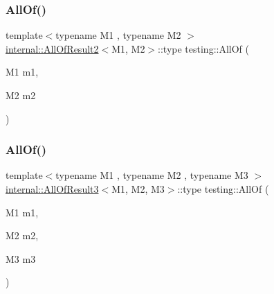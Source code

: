 \mbox{\label{namespacetesting_af7618e8606c1cb45738163688944e2b7}} 
\subsubsection{\texorpdfstring{All\+Of()}{AllOf()}\hspace{0.1cm}{\footnotesize\ttfamily [1/9]}}
{\footnotesize\ttfamily template$<$typename M1 , typename M2 $>$ \\
\hyperlink{structtesting_1_1internal_1_1_all_of_result2}{internal\+::\+All\+Of\+Result2}$<$M1, M2$>$\+::type testing\+::\+All\+Of (\begin{DoxyParamCaption}\item[{M1}]{m1,  }\item[{M2}]{m2 }\end{DoxyParamCaption})\hspace{0.3cm}{\ttfamily [inline]}}

\mbox{\label{namespacetesting_a75934d8ea6b986d2157a5ebfe68f9904}} 
\subsubsection{\texorpdfstring{All\+Of()}{AllOf()}\hspace{0.1cm}{\footnotesize\ttfamily [2/9]}}
{\footnotesize\ttfamily template$<$typename M1 , typename M2 , typename M3 $>$ \\
\hyperlink{structtesting_1_1internal_1_1_all_of_result3}{internal\+::\+All\+Of\+Result3}$<$M1, M2, M3$>$\+::type testing\+::\+All\+Of (\begin{DoxyParamCaption}\item[{M1}]{m1,  }\item[{M2}]{m2,  }\item[{M3}]{m3 }\end{DoxyParamCaption})\hspace{0.3cm}{\ttfamily [inline]}}

\mbox{\label{namespacetesting_a4a9a119cde16e43b364f3573136857a1}} 
